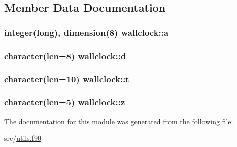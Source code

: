 \subsection{Member Data Documentation}
\hypertarget{classwallclock_a634d56ca30b98ea804c6d33a0a635ec0}{
\subsubsection[{a}]{\setlength{\rightskip}{0pt plus 5cm}integer(long), dimension(8) wallclock\-::a\hspace{0.3cm}{\ttfamily [private]}}}\label{classwallclock_a634d56ca30b98ea804c6d33a0a635ec0}
\hypertarget{classwallclock_a0922e57a4f1a99af864f31246c132d4c}{
\subsubsection[{d}]{\setlength{\rightskip}{0pt plus 5cm}character(len=8) wallclock\-::d\hspace{0.3cm}{\ttfamily [private]}}}\label{classwallclock_a0922e57a4f1a99af864f31246c132d4c}
\hypertarget{classwallclock_a8a94eeecb39db73f1c36c9b00a95c9f7}{
\subsubsection[{t}]{\setlength{\rightskip}{0pt plus 5cm}character(len=10) wallclock\-::t\hspace{0.3cm}{\ttfamily [private]}}}\label{classwallclock_a8a94eeecb39db73f1c36c9b00a95c9f7}
\hypertarget{classwallclock_a47a8e5d4efccd0142b0587c873dad88b}{
\subsubsection[{z}]{\setlength{\rightskip}{0pt plus 5cm}character(len=5) wallclock\-::z\hspace{0.3cm}{\ttfamily [private]}}}\label{classwallclock_a47a8e5d4efccd0142b0587c873dad88b}


The documentation for this module was generated from the following file\-:\begin{DoxyCompactItemize}
\item 
src/\hyperlink{utils_8f90}{utils.\-f90}\end{DoxyCompactItemize}
